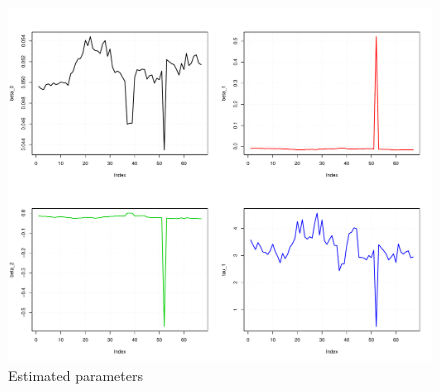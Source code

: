 \begin{figure}[htb]
  \begin{center}
  \caption{Estimated parameters}
\includegraphics{paramdevel}
\end{center}
\end{figure}

%


